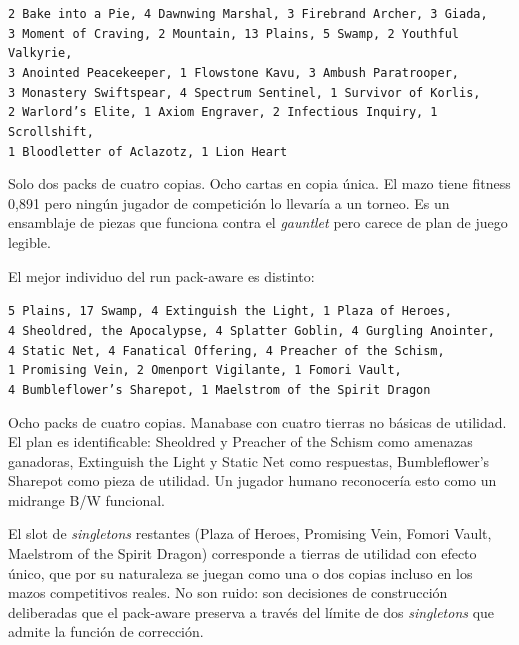 \begin{center}
\small
\texttt{2 Bake into a Pie, 4 Dawnwing Marshal, 3 Firebrand Archer, 3 Giada,}\\
\texttt{3 Moment of Craving, 2 Mountain, 13 Plains, 5 Swamp, 2 Youthful Valkyrie,}\\
\texttt{3 Anointed Peacekeeper, 1 Flowstone Kavu, 3 Ambush Paratrooper,}\\
\texttt{3 Monastery Swiftspear, 4 Spectrum Sentinel, 1 Survivor of Korlis,}\\
\texttt{2 Warlord's Elite, 1 Axiom Engraver, 2 Infectious Inquiry, 1 Scrollshift,}\\
\texttt{1 Bloodletter of Aclazotz, 1 Lion Heart}
\end{center}

Solo dos packs de cuatro copias. Ocho cartas en copia única. El mazo tiene fitness 0,891 pero ningún jugador de competición lo llevaría a un torneo. Es un ensamblaje de piezas que funciona contra el \emph{gauntlet} pero carece de plan de juego legible.

El mejor individuo del run pack-aware es distinto:

\begin{center}
\small
\texttt{5 Plains, 17 Swamp, 4 Extinguish the Light, 1 Plaza of Heroes,}\\
\texttt{4 Sheoldred, the Apocalypse, 4 Splatter Goblin, 4 Gurgling Anointer,}\\
\texttt{4 Static Net, 4 Fanatical Offering, 4 Preacher of the Schism,}\\
\texttt{1 Promising Vein, 2 Omenport Vigilante, 1 Fomori Vault,}\\
\texttt{4 Bumbleflower's Sharepot, 1 Maelstrom of the Spirit Dragon}
\end{center}

Ocho packs de cuatro copias. Manabase con cuatro tierras no básicas de utilidad. El plan es identificable: Sheoldred y Preacher of the Schism como amenazas ganadoras, Extinguish the Light y Static Net como respuestas, Bumbleflower's Sharepot como pieza de utilidad. Un jugador humano reconocería esto como un midrange B/W funcional.

El slot de \emph{singletons} restantes (Plaza of Heroes, Promising Vein, Fomori Vault, Maelstrom of the Spirit Dragon) corresponde a tierras de utilidad con efecto único, que por su naturaleza se juegan como una o dos copias incluso en los mazos competitivos reales. No son ruido: son decisiones de construcción deliberadas que el pack-aware preserva a través del límite de dos \emph{singletons} que admite la función de corrección.

